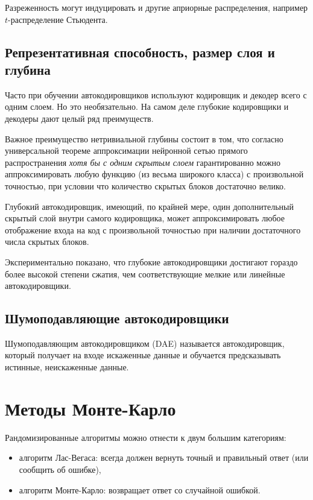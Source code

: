 \documentclass[%
	11pt,
	a4paper,
	utf8,
]{article}
\begin{document}
Разреженность могут индуцировать и другие априорные распределения, например $ t $-распределение Стьюдента.

\subsection{Репрезентативная способность, размер слоя и глубина}

Часто при обучении автокодировщиков используют кодировщик и декодер всего с одним слоем. Но это необязательно. На самом деле глубокие кодировщики и декодеры дают целый ряд преимуществ.

Важное преимущество нетривиальной глубины состоит в том, что согласно универсальной теореме аппроксимации нейронной сетью прямого распространения \emph{хотя бы с одним скрытым слоем} гарантированно можно аппроксимировать любую функцию (из весьма широкого класса) с произвольной точностью, при условии что количество скрытых блоков достаточно велико.

Глубокий автокодировщик, имеющий, по крайней мере, один дополнительный скрытый слой внутри самого кодировщика, может аппроксимировать любое отображение входа на код с произвольной точностью при наличии достаточного числа скрытых блоков.

Экспериментально показано, что глубокие автокодировщики достигают гораздо более высокой степени сжатия, чем соответствующие мелкие или линейные автокодировщики.

\subsection{Шумоподавляющие автокодировщики}

Шумоподавляющим автокодировщиком (DAE) называется автокодировщик, который получает на входе искаженные данные и обучается предсказывать истинные, неискаженные данные.

\section{Методы Монте-Карло}

Рандомизированные алгоритмы можно отнести к двум большим категориям:
\begin{itemize}
	\item алгоритм Лас-Вегаса: всегда должен вернуть точный и правильный ответ (или сообщить об ошибке),
	
	\item алгоритм Монте-Карло: возвращает ответ со случайной ошибкой.
\end{itemize}
\end{document}
